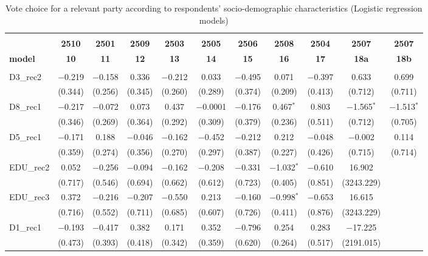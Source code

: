 \documentclass[
]{article}
\begin{document}
\begin{table}[!htbp] \centering 
  \caption{Vote choice for a relevant party according to respondents' 
                       socio-demographic characteristics (Logistic regression models)} 
  \label{table:full_logit_sk} 
\begin{tabular}{@{\extracolsep{5pt}}lcccccccccc} 
\\[-1.8ex]\hline \\[-1.8ex] 
 & \textbf{2510} & \textbf{2501} & \textbf{2509} & \textbf{2503} & \textbf{2505} & \textbf{2506} & \textbf{2508} & \textbf{2504} & \textbf{2507} & \textbf{2507} \\ 
\textbf{model} & \textbf{10} & \textbf{11} & \textbf{12} & \textbf{13} & \textbf{14} & \textbf{15} & \textbf{16} & \textbf{17} & \textbf{18a} & \textbf{18b}\\ 
\hline \\[-1.8ex] 
 D3\_rec2 & $-$0.219 & $-$0.158 & 0.336 & $-$0.212 & 0.033 & $-$0.495 & 0.071 & $-$0.397 & 0.633 & 0.699 \\ 
  & (0.344) & (0.256) & (0.345) & (0.260) & (0.289) & (0.374) & (0.209) & (0.413) & (0.712) & (0.711) \\ 
  D8\_rec1 & $-$0.217 & $-$0.072 & 0.073 & 0.437 & $-$0.0001 & $-$0.176 & 0.467$^{*}$ & 0.803 & $-$1.565$^{*}$ & $-$1.513$^{*}$ \\ 
  & (0.346) & (0.269) & (0.364) & (0.292) & (0.309) & (0.379) & (0.236) & (0.511) & (0.712) & (0.705) \\ 
  D5\_rec1 & $-$0.171 & 0.188 & $-$0.046 & $-$0.162 & $-$0.452 & $-$0.212 & 0.212 & $-$0.048 & $-$0.002 & 0.114 \\ 
  & (0.359) & (0.274) & (0.356) & (0.270) & (0.297) & (0.387) & (0.227) & (0.426) & (0.715) & (0.714) \\ 
  EDU\_rec2 & 0.052 & $-$0.256 & $-$0.094 & $-$0.162 & $-$0.208 & $-$0.331 & $-$1.032$^{*}$ & $-$0.610 & 16.902 &  \\ 
  & (0.717) & (0.546) & (0.694) & (0.662) & (0.612) & (0.723) & (0.405) & (0.851) & (3243.229) &  \\ 
  EDU\_rec3 & 0.372 & $-$0.216 & $-$0.207 & $-$0.550 & 0.213 & $-$0.160 & $-$0.998$^{*}$ & $-$0.653 & 16.615 &  \\ 
  & (0.716) & (0.552) & (0.711) & (0.685) & (0.607) & (0.726) & (0.411) & (0.876) & (3243.229) &  \\ 
  D1\_rec1 & $-$0.193 & $-$0.417 & 0.382 & 0.171 & 0.352 & $-$0.796 & 0.254 & 0.283 & $-$17.225 &  \\ 
  & (0.473) & (0.393) & (0.418) & (0.342) & (0.359) & (0.620) & (0.264) & (0.517) & (2191.015) &  \\ 

\end{tabular}
\end{table}
\end{document}
